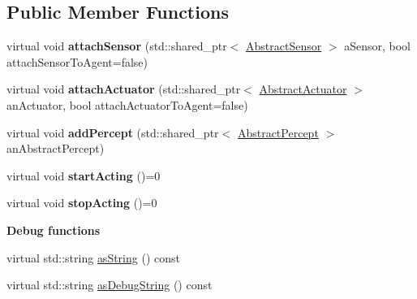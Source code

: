 \subsection*{Public Member Functions}
\begin{DoxyCompactItemize}
\item 
virtual void {\bfseries attach\+Sensor} (std\+::shared\+\_\+ptr$<$ \hyperlink{class_model_1_1_abstract_sensor}{Abstract\+Sensor} $>$ a\+Sensor, bool attach\+Sensor\+To\+Agent=false)\hypertarget{class_model_1_1_abstract_agent_a9e9a85420a923bb7d68acbda8208e2ad}{}\label{class_model_1_1_abstract_agent_a9e9a85420a923bb7d68acbda8208e2ad}

\item 
virtual void {\bfseries attach\+Actuator} (std\+::shared\+\_\+ptr$<$ \hyperlink{class_model_1_1_abstract_actuator}{Abstract\+Actuator} $>$ an\+Actuator, bool attach\+Actuator\+To\+Agent=false)\hypertarget{class_model_1_1_abstract_agent_a87cba14848a2ef4ec831ed2e44e85b63}{}\label{class_model_1_1_abstract_agent_a87cba14848a2ef4ec831ed2e44e85b63}

\item 
virtual void {\bfseries add\+Percept} (std\+::shared\+\_\+ptr$<$ \hyperlink{class_model_1_1_abstract_percept}{Abstract\+Percept} $>$ an\+Abstract\+Percept)\hypertarget{class_model_1_1_abstract_agent_ab8fb558bec05bc1a7ea5402bf996705f}{}\label{class_model_1_1_abstract_agent_ab8fb558bec05bc1a7ea5402bf996705f}

\item 
virtual void {\bfseries start\+Acting} ()=0\hypertarget{class_model_1_1_abstract_agent_a783133675cf1d592a95eadcbded59d2e}{}\label{class_model_1_1_abstract_agent_a783133675cf1d592a95eadcbded59d2e}

\item 
virtual void {\bfseries stop\+Acting} ()=0\hypertarget{class_model_1_1_abstract_agent_a369070540beac48686890b06d831fabe}{}\label{class_model_1_1_abstract_agent_a369070540beac48686890b06d831fabe}

\end{DoxyCompactItemize}
\begin{Indent}{\bf Debug functions}\par
\begin{DoxyCompactItemize}
\item 
virtual std\+::string \hyperlink{class_model_1_1_abstract_agent_a4cee6603af332eb80d524bf3af70489a}{as\+String} () const 
\item 
virtual std\+::string \hyperlink{class_model_1_1_abstract_agent_abcb33490b0f5761a2659bf705aff04b5}{as\+Debug\+String} () const 
\end{DoxyCompactItemize}
\end{Indent}
